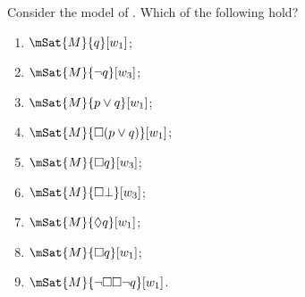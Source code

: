\documentclass[../../../include/open-logic-section]{subfiles}
\begin{document}
\begin{prob}
  Consider the model of . Which of the
  following hold?
    \begin{enumerate}
    \item $\mSat{M}{q}[w_1]$;
    \item $\mSat{M}{\lnot q}[w_3]$;
    \item $\mSat{M}{p \lor q}[w_1]$;
    \item $\mSat{M}{\Box (p \lor q)}[w_1]$;
    \item $\mSat{M}{\Box q}[w_3]$;
    \item $\mSat{M}{\Box \bot}[w_3]$;
    \item $\mSat{M}{\Diamond q}[w_1]$;
    \item $\mSat{M}{\Box q}[w_1]$;
    \item $\mSat{M}{\lnot \Box\Box \lnot q}[w_1]$.
    \end{enumerate}
\end{prob}
\end{document}
